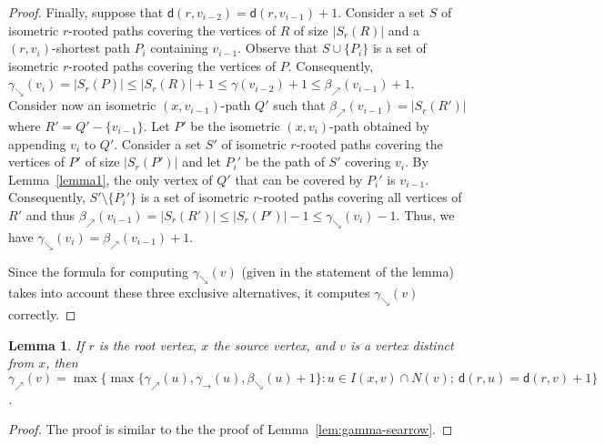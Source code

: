 \documentclass[a4paper]{article}
\newcommand{\dist}[2]{\mathsf{d}\left(#1,#2\right)}
\newcommand{\coverP}[2]{S_{#1}\left(#2\right)}
\newtheorem{lemma}[theorem]{Lemma}
\begin{document}
\begin{proof}
  Finally, suppose that $\dist{r}{v_{i-2}}=\dist{r}{v_{i-1}}+1$.
  Consider a set $S$ of isometric $r$-rooted paths covering the
  vertices of $R$ of size $|\coverP{r}{R}|$ and a $(r,v_i)$-shortest
  path $P_i$ containing $v_{i-1}$. Observe that $S \cup \{P_{i}\}$ is
  a set of isometric $r$-rooted paths covering the vertices of
  $P$. Consequently,
  $\gamma_{\searrow}(v_{i}) = |\coverP{r}{P}| \leq |\coverP{r}{R}| + 1
  \leq \gamma(v_{i-2}) +1 \leq \beta_{\nearrow}(v_{i-1})+1$.  Consider
  now an isometric $(x,v_{i-1})$-path $Q'$ such that
  $\beta_{\nearrow}(v_{i-1}) =|\coverP{r}{R'}|$ where
  $R' = Q' - \{v_{i-1}\}$.  Let $P'$ be the isometric $(x,v_i)$-path
  obtained by appending $v_i$ to $Q'$.  Consider a set $S'$ of
  isometric $r$-rooted paths covering the vertices of $P'$ of size
  $|\coverP{r}{P'}|$ and let $P_i'$ be the path of $S'$ covering
  $v_i$.  By Lemma~\ref{lemma1}, the only vertex of $Q'$ that can be
  covered by $P_i'$ is $v_{i-1}$.  Consequently,
  $S' \setminus \{P_i'\}$ is a set of isometric $r$-rooted paths
  covering all vertices of $R'$ and thus
  $\beta_{\nearrow}(v_{i-1}) = |\coverP{r}{R'}| \leq |\coverP{r}{P'}|
  - 1 \leq \gamma_{\searrow}(v_i)-1$. Thus, we have
  $\gamma_{\searrow}(v_i) = \beta_{\nearrow}(v_{i-1})+1$.

  Since the formula for computing $\gamma_{\searrow}(v)$ (given in the
  statement of the lemma) takes into account these three exclusive
  alternatives, it computes $\gamma_{\searrow}(v)$ correctly.
\end{proof}

\begin{lemma}\label{lem:gamma-nearrow}
  If  $r$ is  the root vertex, $x$  the source vertex, and $v$ is a
  vertex distinct from $x$, then 
  $\gamma_{\nearrow}(v) = \max \{
  \max\{\gamma_{\nearrow}(u),\gamma_{\rightarrow}(u),\beta_{\searrow}(u)+1\}
  : u\in I(x,v) \cap N(v);\ \dist{r}{u}=\dist{r}{v}+1 \}$.
\end{lemma}


  \begin{proof}
    The proof is similar to the the proof of
    Lemma~\ref{lem:gamma-searrow}.
  \end{proof}



\end{document}
